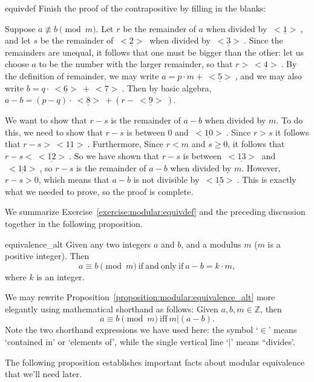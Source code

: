 \begin{exercise}{equivdef}
Finish the proof of the contrapositive by filling in the blanks:

\noindent
Suppose $a \not\equiv b \pmod{m}$. Let $r$ be the remainder of $a$ when divided by $\underline{~<1>~}$, and let $s$ be  the remainder of $\underline{~<2>~}$ when divided by $\underline{~<3>~}$. Since the remainders are unequal, it follows that one must be bigger than the other: let us choose $a$ to be the number with the larger remainder, so that $r > \underline{~<4>~}$. By the definition of remainder, we may write $a = p\cdot m + \underline{~<5>~}$, and we may also write $b = q\cdot \underline{~<6>~} + \underline{~<7>~}$. Then by basic algebra, $a - b = (p-q)\cdot \underline{~<8>~} + (r - \underline{~<9>~})$. 

We want to show that $r-s$ is the remainder of $a-b$ when divided by $m$. To do this, we need to show that $r-s$ is between 0 and $\underline{~<10>~}$. Since $r>s$ it follows that $r-s > \underline{~<11>~}$. Furthermore,
Since $r < m$ and $s \ge 0$, it follows that $r - s < \underline{~<12>~}$.  So we have shown that $r-s$ is between $\underline{~<13>~}$ and $\underline{~<14>~}$, so 
$r-s$ is the remainder of $a-b$ when divided by $m$. However, $r-s > 0$, which means that $a-b$ is not divisible by $\underline{~<15>~}$. This is exactly what we needed to prove, so the proof is complete. 
\end{exercise}

We summarize Exercise~\ref{exercise:modular:equivdef} and the preceding discussion together in the following proposition.

\begin{prop}{equivalence_alt}
Given any two integers $a$ and $b$, and a modulus $m$ ($m$ is a positive integer). Then 
\[
a \equiv b \pmod{m} \mathrm{~if~and~only~if~} a - b = k \cdot m,
\]
where $k$ is an integer.
\end{prop}
\noindent
We may rewrite Proposition~\ref{proposition:modular:equivalence_alt} more elegantly using mathematical shorthand as follows: Given $a,b,m \in {\mathbb Z}$, then 
\[
a \equiv b \pmod{m} \mathrm{~iff~} m | (a - b).
\]
Note the two shorthand expressions we have used here:  the symbol  `$\in$'  means `contained in' or `elements of', while the single vertical line `$|$' means ``divides'.


The following proposition establishes important facts about modular equivalence that we'll need later.


